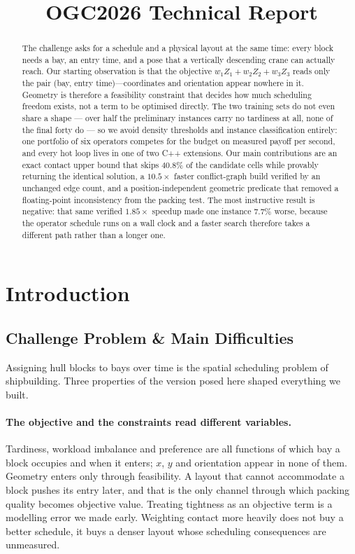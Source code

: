 \documentclass[runningheads]{llncs}
\begin{document}
\title{OGC2026 Technical Report}
\maketitle

\begin{abstract}
The challenge asks for a schedule and a physical layout at the same time: every block needs a
bay, an entry time, and a pose that a vertically descending crane can actually reach. Our
starting observation is that the objective $w_1Z_1+w_2Z_2+w_3Z_3$ reads only the pair (bay,
entry time)---coordinates and orientation appear nowhere in it. Geometry is therefore a
feasibility constraint that decides how much scheduling freedom exists, not a term to be optimised
directly. The two training sets do not even share a shape --- over half the preliminary instances
carry no tardiness at all, none of the final forty do --- so we avoid density thresholds and instance
classification entirely: one portfolio of six operators competes for the budget on
measured payoff per second, and every hot loop lives in one of two C++ extensions. Our main contributions are an exact contact upper bound that skips $40.8\%$ of the
candidate cells while provably returning the identical solution, a $10.5\times$ faster
conflict-graph build verified by an unchanged edge count, and a position-independent geometric
predicate that removed a floating-point inconsistency from the packing test. The most instructive
result is negative: that same verified $1.85\times$ speedup made one instance $7.7\%$ worse,
because the operator schedule runs on a wall clock and a faster search therefore takes a different
path rather than a longer one.
\end{abstract}

\section{Introduction}

\subsection{Challenge Problem \& Main Difficulties}

Assigning hull blocks to bays over time is the spatial scheduling problem of shipbuilding. Three
properties of the version posed here shaped everything we built.

\paragraph{The objective and the constraints read different variables.}
Tardiness, workload imbalance and preference are all functions of which bay a block occupies and
when it enters; $x$, $y$ and orientation appear in none of them. Geometry enters only through
feasibility. A layout that cannot accommodate a block pushes its entry later, and that is the only
channel through which packing quality becomes objective value. Treating tightness as an objective
term is a modelling error we made early. Weighting contact more heavily does not buy a better
schedule, it buys a denser layout whose scheduling consequences are unmeasured.
\end{document}
